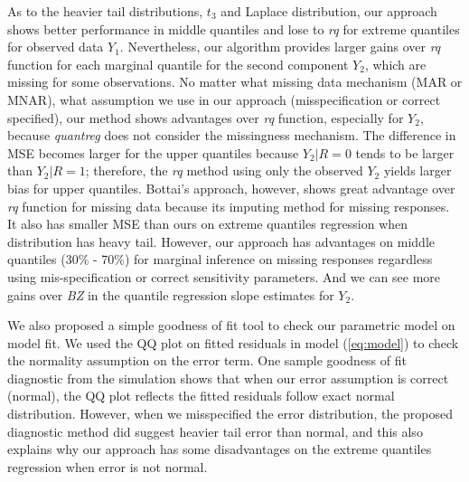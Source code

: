 \documentclass[12pt]{article}
\begin{document}
As to the heavier tail distributions, $t_3$ and Laplace distribution,
our approach shows better performance in middle quantiles and lose to
\textit{rq} for extreme quantiles for observed data
$Y_1$. Nevertheless, our algorithm provides larger gains over
\textit{rq} function for each marginal quantile for the second
component $Y_2$, which are missing for some observations.  No matter
what missing data mechanism (MAR or MNAR), what assumption we use in
our approach (misspecification or correct specified), our method
shows advantages over \textit{rq} function, especially for $Y_2$,
because \textit{quantreg} does not consider the missingness
mechanism. The difference in MSE becomes larger for the upper
quantiles because $Y_2 |R = 0$ tends to be larger than $Y_2 | R = 1$;
therefore, the \textit{rq} method using only the observed $Y_2$ yields
larger bias for upper quantiles. Bottai's approach, however, shows
great advantage over \textit{rq} function for missing data because its
imputing method for missing responses.  It also has smaller MSE than
ours on extreme quantiles regression when distribution has heavy
tail. However, our approach has advantages on middle quantiles (30\% -
70\%) for marginal inference on missing responses regardless using
mis-specification or correct sensitivity parameters. And we can see more gains over \textit{BZ} in the quantile regression slope estimates for
$Y_2$.

We also proposed a simple goodness of fit tool to check our parametric
model on model fit. We used the QQ plot on fitted residuals in model
(\ref{eq:model}) to check the normality assumption on the error
term. One sample goodness of fit diagnostic from the simulation
 shows that when our error
assumption is correct (normal), the QQ plot reflects the fitted
residuals follow exact normal distribution. However, when we
misspecified the error distribution, the proposed diagnostic method
did suggest heavier tail error than normal, and this also explains why
our approach has some disadvantages on the extreme quantiles
regression when error is not normal.
\end{document}
